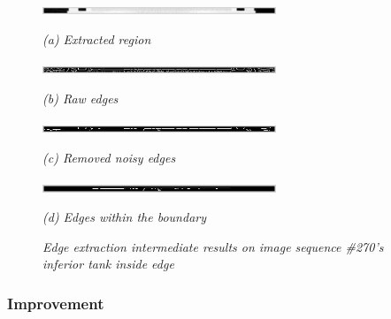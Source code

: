 \begin{figure}[htb]
  \begin{minipage}[t]{2.75in}
    \centering
    \centerline{\mbox{\includegraphics[width=2.75in]{data_extraction/images/sample/20121017_270/Coronal/inferior_inside/1_region.eps}}}
    \centerline{\emph{(a) Extracted region}}
  \end{minipage}\medskip
  \begin{minipage}[t]{2.75in}
    \centerline{\mbox{\includegraphics[width=2.75in]{data_extraction/images/sample/20121017_270/Coronal/inferior_inside/2_raw_edges.eps}}}
    \centerline{\emph{(b) Raw edges}}
  \end{minipage}
  \begin{minipage}[t]{2.75in}
    \centerline{\mbox{\includegraphics[width=2.75in]{data_extraction/images/sample/20121017_270/Coronal/inferior_inside/3_removed_noise.eps}}}
    \centerline{\emph{(c) Removed noisy edges}}
  \end{minipage}\medskip
  \begin{minipage}[t]{2.75in}
    \centerline{\mbox{\includegraphics[width=2.75in]{data_extraction/images/sample/20121017_270/Coronal/inferior_inside/4_within_boundary.eps}}}
    \centerline{\emph{(d) Edges within the boundary}}
  \end{minipage}
  \caption{\emph{Edge extraction intermediate results on image sequence \#270's inferior tank inside edge}}
  \label{fig:coronal_270_intermediate_results}
\end{figure}

\subsubsection{Improvement}



